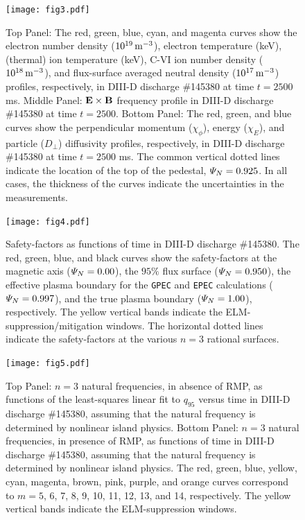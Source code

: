 \documentclass[12pt,prb,aps]{revtex4-1}
\begin{document}
\begin{figure}
\texttt{[image: fig3.pdf]}
\caption{Top Panel: The red, green, blue,  cyan, and magenta curves show the electron number density ($10^{19}\,{\rm m}^{-3}$),
electron temperature (keV), (thermal) ion temperature (keV), 
 C-VI ion number density  ($10^{18}\,{\rm m}^{-3}$), and flux-surface averaged neutral density ($10^{17}\,{\rm m}^{-3}$)   profiles, respectively,  in  DIII-D discharge \#145380 at time $t=2500$ ms. Middle Panel:  
 ${\bf E}\times {\bf B}$ frequency profile in  DIII-D discharge \#145380 at time $t=2500$. Bottom Panel: The red, green, and blue curves show
 the perpendicular momentum ($\chi_\phi$), energy ($\chi_E$), and particle ($D_\perp$) diffusivity profiles, respectively, 
 in  DIII-D discharge \#145380 at time $t=2500$ ms.
The   common vertical dotted lines indicate the location of the top
of the pedestal, ${\mit\Psi}_N=0.925$. In all cases, the thickness of the curves indicate the uncertainties in the measurements.} \label{fig3}
\end{figure}

\begin{figure}
\texttt{[image: fig4.pdf]}
\caption{Safety-factors as functions of time in  DIII-D discharge \#145380. The red, green, blue, and black curves show the safety-factors
at the magnetic axis (${\mit\Psi}_N=0.00$),
the $95\%$ flux surface (${\mit\Psi}_N=0.950$), the
effective plasma boundary for the {\tt GPEC} and {\tt EPEC} calculations
(${\mit\Psi}_N=0.997$), and the true plasma boundary (${\mit\Psi}_N=1.00$), respectively. The yellow vertical bands indicate the ELM-suppression/mitigation windows. 
The horizontal dotted lines indicate the safety-factors at the various $n=3$ rational surfaces.} \label{fig4}
\end{figure}

\begin{figure}
\texttt{[image: fig5.pdf]}
\caption{Top Panel: $n=3$ natural frequencies, in absence of RMP, as functions of the least-squares linear fit to $q_{95}$ versus time
in   DIII-D discharge \#145380, assuming that the natural frequency is determined by nonlinear island physics.
Bottom Panel:  $n=3$ natural frequencies, in presence of RMP, as functions of time
in   DIII-D discharge \#145380, assuming that the natural frequency is determined by nonlinear island physics. The red, green, blue, yellow, cyan, magenta, brown, pink,
purple, and orange  curves correspond to $m=5$, 6, 7, 8, 9, 10, 11, 12, 13, and 14, respectively. The yellow vertical bands indicate the ELM-suppression windows.} \label{fig5}
\end{figure}
\end{document}
